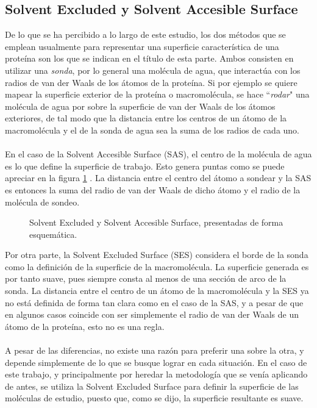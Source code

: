 \documentclass[12pt, twoside, onehalfspace, numbers, spanish]{ezthesis}
\numberwithin{equation}{section}
\begin{document}
\subsection{Solvent Excluded y Solvent Accesible Surface}\label{subsec:SES_SAS}
De lo que se ha percibido a lo largo de este estudio, los dos métodos que se emplean usualmente para representar una superficie característica de una proteína son los que se indican en el título de esta parte. Ambos consisten en utilizar una \textit{sonda}, por lo general una molécula de agua, que interactúa con los radios de van der Waals de los átomos de la proteína. Si por ejemplo se quiere mapear la superficie exterior de la proteína o macromolécula, se hace ``\textit{rodar}" una molécula de agua por sobre la superficie de van der Waals de los átomos exteriores, de tal modo que la distancia entre los centros de un átomo de la macromolécula y el de la sonda de agua sea la suma de los radios de cada uno.\\\\
En el caso de la Solvent Accesible Surface (SAS), el centro de la molécula de agua es lo que define la superficie de trabajo. Esto genera puntas como se puede apreciar en la figura \ref{Fig:SAS_and_SES} . La distancia entre el centro del átomo a sondear y la SAS es entonces la suma del radio de van der Waals de dicho átomo y el radio de la molécula de sondeo.

\begin{figure}[h]
	\centering
	
	\caption{Solvent Excluded y Solvent Accesible Surface, presentadas de forma esquemática.}\label{Fig:SAS_and_SES}
\end{figure}
\noindent
Por otra parte, la Solvent Excluded Surface (SES) considera el borde de la sonda como la definición de la superficie de la macromolécula. La superficie generada es por tanto suave, pues siempre consta al menos de una sección de arco de la sonda. La distancia entre el centro de un átomo de la macromolécula y la SES ya no está definida de forma tan clara como en el caso de la SAS, y a pesar de que en algunos casos coincide con ser simplemente el radio de van der Waals de un átomo de la proteína, esto no es una regla.\\\\
A pesar de las diferencias, no existe una razón para preferir una sobre la otra, y depende simplemente de lo que se busque lograr en cada situación. En el caso de este trabajo, y principalmente por heredar la metodología que se venía aplicando de antes, se utiliza la Solvent Excluded Surface para definir la superficie de las moléculas de estudio, puesto que, como se dijo, la superficie resultante es suave.
\end{document}
